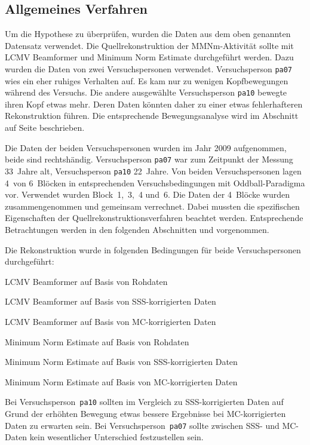 \documentclass[doc,a4paper,12pt]{apa6}
\makeatletter
\DeclareRobustCommand*{\nameref}[1]{%
      \glqq{\myorg@nameref{#1}}\grqq%
    }%
\makeatother
\begin{document}
\subsection{Allgemeines Verfahren}

Um die Hypothese zu überprüfen, wurden die Daten aus dem oben genannten Datensatz verwendet. Die Quellrekonstruktion der MMNm-Aktivität sollte mit LCMV Beamformer und Minimum Norm Estimate durchgeführt werden. Dazu wurden die Daten von zwei Versuchspersonen verwendet. Versuchsperson \texttt{pa07} wies ein eher ruhiges Verhalten auf. Es kam nur zu wenigen Kopfbewegungen während des Versuchs. Die andere ausgewählte Versuchsperson \texttt{pa10} bewegte ihren Kopf etwas mehr. Deren Daten könnten daher zu einer etwas fehlerhafteren Rekonstruktion führen. Die entsprechende Bewegungsanalyse wird im Abschnitt \nameref{sec:bewegung} auf Seite \pageref{sec:bewegung} beschrieben.

Die Daten der beiden Versuchspersonen wurden im Jahr 2009 aufgenommen, beide sind rechtshändig. Versuchsperson \texttt{pa07} war zum Zeitpunkt der Messung 33~Jahre alt, Versuchsperson \texttt{pa10} 22~Jahre. Von beiden Versuchspersonen lagen 4~von 6~Blöcken in entsprechenden Versuchsbedingungen mit Oddball-Paradigma vor. Verwendet wurden Block~1,~3,~4 und~6. Die Daten der 4~Blöcke wurden zusammengenommen und gemeinsam verrechnet. Dabei mussten die spezifischen Eigenschaften der Quellrekonstruktionsverfahren beachtet werden. Entsprechende Betrachtungen werden in den folgenden Abschnitten \nameref{sec:lead-beam-mne} und \nameref{sec:amplitud} vorgenommen.

Die Rekonstruktion wurde in folgenden Bedingungen für beide Versuchspersonen durchgeführt:

\begin{compactitem}
\item LCMV Beamformer auf Basis von Rohdaten
\item LCMV Beamformer auf Basis von SSS-korrigierten Daten
\item LCMV Beamformer auf Basis von MC-korrigierten Daten
\item Minimum Norm Estimate auf Basis von Rohdaten
\item Minimum Norm Estimate auf Basis von SSS-korrigierten Daten
\item Minimum Norm Estimate auf Basis von MC-korrigierten Daten
\end{compactitem}

Bei Versuchsperson~\texttt{pa10} sollten im Vergleich zu SSS-korrigierten Daten auf Grund der erhöhten Bewegung etwas bessere Ergebnisse bei MC-korrigierten Daten zu erwarten sein. Bei Versuchsperson~\texttt{pa07} sollte zwischen SSS- und MC-Daten kein wesentlicher Unterschied festzustellen sein.
\end{document}
